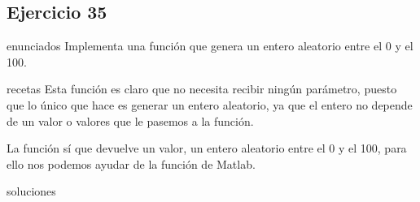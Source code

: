 \subsection{Ejercicio 35}
\def\parte{enunciados}
\ifx\capitulo\parte
Implementa una función que genera un entero aleatorio entre el 0 y el 100.
\fi

\def\parte{recetas}
\ifx\capitulo\parte
Esta función es claro que no necesita recibir ningún parámetro, puesto que lo único que hace es generar un entero aleatorio, ya que el entero no depende de un valor o valores que le pasemos a la función.

La función sí que devuelve un valor, un entero aleatorio entre el 0 y el 100, para ello nos podemos ayudar de la función  de Matlab.
\fi

\def\parte{soluciones}
\ifx\capitulo\parte

\fi

